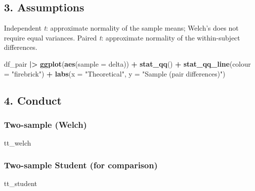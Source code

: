 \documentclass[
]{article}
\newenvironment{Shaded}{\begin{snugshade}}{\end{snugshade}}
\newcommand{\AttributeTok}[1]{\textcolor[rgb]{0.13,0.29,0.53}{#1}}
\newcommand{\FunctionTok}[1]{\textcolor[rgb]{0.13,0.29,0.53}{\textbf{#1}}}
\newcommand{\NormalTok}[1]{#1}
\newcommand{\SpecialCharTok}[1]{\textcolor[rgb]{0.81,0.36,0.00}{\textbf{#1}}}
\newcommand{\StringTok}[1]{\textcolor[rgb]{0.31,0.60,0.02}{#1}}
\begin{document}
\subsection{3. Assumptions}\label{assumptions}

Independent \emph{t}: approximate normality of the sample means; Welch's
does not require equal variances. Paired \emph{t}: approximate normality
of the within-subject differences.

\begin{Shaded}
\begin{Highlighting}[]
\NormalTok{df\_pair }\SpecialCharTok{|\textgreater{}}
  \FunctionTok{ggplot}\NormalTok{(}\FunctionTok{aes}\NormalTok{(}\AttributeTok{sample =}\NormalTok{ delta)) }\SpecialCharTok{+}
  \FunctionTok{stat\_qq}\NormalTok{() }\SpecialCharTok{+} \FunctionTok{stat\_qq\_line}\NormalTok{(}\AttributeTok{colour =} \StringTok{"firebrick"}\NormalTok{) }\SpecialCharTok{+}
  \FunctionTok{labs}\NormalTok{(}\AttributeTok{x =} \StringTok{"Theoretical"}\NormalTok{, }\AttributeTok{y =} \StringTok{"Sample (pair differences)"}\NormalTok{)}
\end{Highlighting}
\end{Shaded}

\subsection{4. Conduct}\label{conduct}

\subsubsection{Two-sample (Welch)}\label{two-sample-welch}

\begin{Shaded}
\begin{Highlighting}[]
\NormalTok{tt\_welch}
\end{Highlighting}
\end{Shaded}

\subsubsection{Two-sample Student (for
comparison)}\label{two-sample-student-for-comparison}

\begin{Shaded}
\begin{Highlighting}[]
\NormalTok{tt\_student}
\end{Highlighting}
\end{Shaded}
\end{document}
